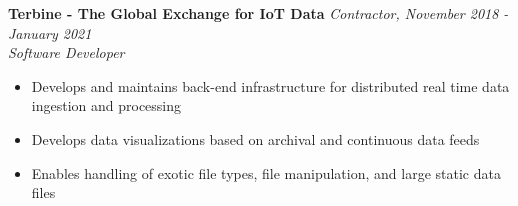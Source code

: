 \documentclass{res}
\begin{document}
\begin{resume}
		{\bf Terbine - The Global Exchange for IoT Data} \hfill \emph{Contractor, November 2018 - January 2021} \\
			\emph{Software Developer}

			\begin{itemize} \itemsep -2pt
				\item Develops and maintains back-end infrastructure for distributed real time data ingestion and processing
				\item Develops data visualizations based on archival and continuous data feeds
				\item Enables handling of exotic file types, file manipulation, and large static data files
			\end{itemize} \vspace{-2mm}

\vspace{-3pt}


\end{resume}
\end{document}
